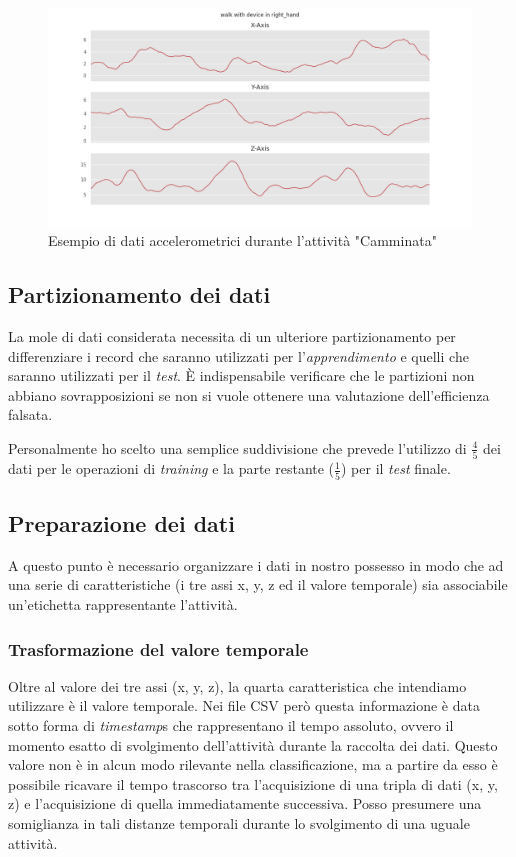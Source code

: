 \begin{figure}[H]
    \centering
    \includegraphics[scale = 0.45]{assets/images/classifications/accelerometer/right_hand/walk-right-hand-acc.png}
    \caption{Esempio di dati accelerometrici durante l'attività "Camminata"}
\end{figure}


\newpage
\subsection{Partizionamento dei dati}
La mole di dati considerata necessita di un ulteriore partizionamento per differenziare i record che saranno utilizzati per 
l'\textit{apprendimento} e quelli che saranno utilizzati per il \textit{test}.
È indispensabile verificare che le partizioni non abbiano sovrapposizioni se non si vuole ottenere una valutazione dell'efficienza falsata.

\vspace{5mm} %

Personalmente ho scelto una semplice suddivisione che prevede l'utilizzo di $\frac{4}{5}$ dei dati per le operazioni di \textit{training} e 
la parte restante ($\frac{1}{5}$) per il \textit{test} finale.


\subsection{Preparazione dei dati}
\label{section:learning-data-preparation}
A questo punto è necessario organizzare i dati in nostro possesso in modo che 
ad una serie di caratteristiche (i tre assi x, y, z ed il valore temporale) sia associabile un'etichetta 
rappresentante l'attività. 

\subsubsection{Trasformazione del valore temporale}
Oltre al valore dei tre assi (x, y, z), la quarta caratteristica che intendiamo utilizzare è il valore temporale.
Nei file CSV però questa informazione è data sotto forma di \textit{timestamp}s che rappresentano il tempo assoluto, 
ovvero il momento esatto di svolgimento dell'attività durante la raccolta dei dati.
Questo valore non è in alcun modo rilevante nella classificazione, ma a partire da esso è possibile ricavare il tempo trascorso 
tra l'acquisizione di una tripla di dati (x, y, z) e l'acquisizione di quella immediatamente successiva.
Posso presumere una somiglianza in tali distanze temporali durante lo svolgimento di una uguale attività.

